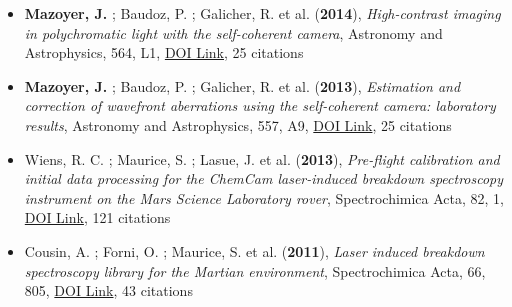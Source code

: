 \documentclass[11pt]{article}
\begin{document}
\begin{itemize}
\item {\bf Mazoyer, J.} ; Baudoz, P. ; Galicher, R. et al. ({\bf2014}), {\it High-contrast imaging in polychromatic light with the self-coherent camera}, Astronomy and Astrophysics, 564, L1, \href{https://doi.org/10.1051/0004-6361/201423375}{DOI Link}, 25 citations

\item {\bf Mazoyer, J.} ; Baudoz, P. ; Galicher, R. et al. ({\bf2013}), {\it Estimation and correction of wavefront aberrations using the self-coherent camera: laboratory results}, Astronomy and Astrophysics, 557, A9, \href{https://doi.org/10.1051/0004-6361/201321706}{DOI Link}, 25 citations

\item Wiens, R. C. ; Maurice, S. ; Lasue, J. et al. ({\bf2013}), {\it Pre-flight calibration and initial data processing for the ChemCam laser-induced breakdown spectroscopy instrument on the Mars Science Laboratory rover}, Spectrochimica Acta, 82, 1, \href{https://doi.org/10.1016/j.sab.2013.02.003}{DOI Link}, 121 citations

\item Cousin, A. ; Forni, O. ; Maurice, S. et al. ({\bf2011}), {\it Laser induced breakdown spectroscopy library for the Martian environment}, Spectrochimica Acta, 66, 805, \href{https://doi.org/10.1016/j.sab.2011.10.004}{DOI Link}, 43 citations

\end{itemize}
\end{document}
